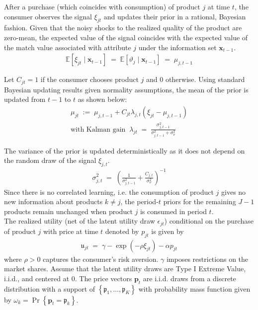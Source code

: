 \documentclass[11pt]{article}
\newcommand{\E}{\mathbb{E}}
\begin{document}
\noindent After a purchase (which coincides with consumption) of product $j$ at time $t$, the consumer observes the signal $\xi_{j t}$ and updates their prior in a rational, Bayesian fashion. Given that the noisy shocks to the realized quality of the product are zero-mean, the expected value of the signal coincides with the expected value of the match value associated with attribute $j$ under the information set $\boldsymbol{x}_{t-1}$.
\begin{gather*}
    \E\left[\xi_{jt} \mid \boldsymbol{x}_{t-1} \right] \; = \; \E\left[\vartheta_{j} \mid \boldsymbol{x}_{t-1} \right] \; = \; \mu_{j,t-1}
\end{gather*}

\noindent Let $C_{jt} = 1$ if the consumer chooses product $j$ and $0$ otherwise. Using standard Bayesian updating results given normality assumptions, the mean of the prior is updated from $t-1$ to $t$ as shown below:
\begin{gather*}
    \mu_{jt} \; := \;   \mu_{j,t-1}+ C_{jt} \lambda_{j,t} \left( \xi_{jt} - \mu_{j,t-1}  \right) \\
\text{with Kalman gain} \;\; 
\lambda_{jt} \; = \; \frac{\sigma^2_{j,t-1}}{\sigma^2_{j,t-1} + \sigma^2_{\nu}}
\end{gather*}

\noindent The variance of the prior is updated deterministically as it does not depend on the random draw of the signal $\xi_{j,t}$.
\begin{gather*}
\sigma^2_{j,t} \; = \; {\left(\frac{1}{\sigma^2_{j,t-1}} + \frac{C_{j,t}}{\sigma^2_{\nu}} \right)}^{-1}
\end{gather*}
\noindent Since there is no correlated learning, i.e. the consumption of product $j$ gives no new information about products $k \neq j$, the period-$t$ priors for the remaining $J - 1$ products remain unchanged when product $j$ is consumed in period $t$.\\

\noindent The realized utility (net of the latent utility draw $\epsilon_{j t}$) conditional on the purchase of product $j$ with price at time $t$ denoted by $p_{j t}$ is given by
\begin{gather*}
\mathfrak{u}_{j t} \; = \; \gamma-\exp \left(-\rho \xi_{j t}\right)-\alpha p_{j t}
\end{gather*}
\noindent where $\rho > 0$ captures the consumer's risk aversion. $\gamma$ imposes restrictions on the market shares. Assume that the latent utility draws are Type I Extreme Value, i.i.d., and centered at 0. The price vectors $\mathbf{p}_{t}$ are i.i.d. draws from a discrete distribution with a support of $\left\{\boldsymbol{\mathfrak{p}}_{1}, \ldots, \boldsymbol{\mathfrak{p}}_{K}\right\}$ with probability mass function given by $\omega_{k}=\operatorname{Pr}\left\{\boldsymbol{p}_{t}=\boldsymbol{\mathfrak{p}}_{k}\right\}$.\\
\end{document}
